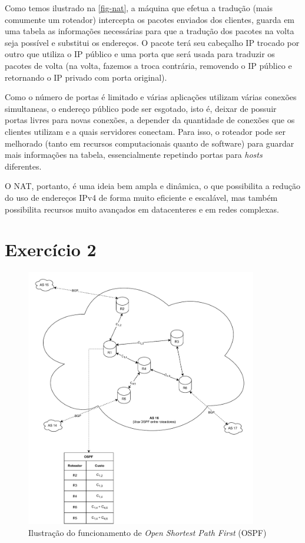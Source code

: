 \documentclass[brazilian,a4paper]{article}
\begin{document}
Como temos ilustrado na \cref{fig-nat}, a máquina que efetua a tradução (mais comumente um roteador) intercepta os pacotes enviados dos clientes, guarda em uma tabela as informações necessárias para que a tradução dos pacotes na volta seja possível e substitui os endereços. O pacote terá seu cabeçalho IP trocado por outro que utiliza o IP público e uma porta que será usada para traduzir os pacotes de volta (na volta, fazemos a troca contrária, removendo o IP público e retornando o IP privado com porta original).

Como o número de portas é limitado e várias aplicações utilizam várias conexões simultaneas, o endereço público pode ser esgotado, isto é, deixar de possuir portas livres para novas conexões, a depender da quantidade de conexões que os clientes utilizam e a quais servidores conectam. Para isso, o roteador pode ser melhorado (tanto em recursos computacionais quanto de software) para guardar mais informações na tabela, essencialmente repetindo portas para \textit{hosts} diferentes.

O NAT, portanto, é uma ideia bem ampla e dinâmica, o que possibilita a redução do uso de endereços IPv4 de forma muito eficiente e escalável, mas também possibilita recursos muito avançados em datacenteres e em redes complexas.


\section*{Exercício 2}

\begin{figure}[h!]
    \centering
    \includegraphics[width=0.9\textwidth]{prova2-ospf.pdf}
    \caption{Ilustração do funcionamento de \textit{Open Shortest Path First} (OSPF)}
    \label{fig-ospf}
\end{figure}
\end{document}
